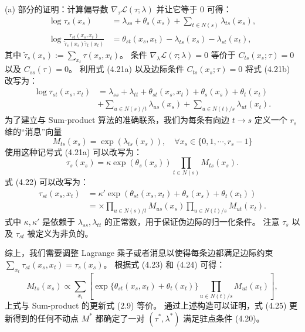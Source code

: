 \analysis[证明]
(a) 部分的证明：计算偏导数 $\nabla_{\tau}\mathcal{L}(\tau; \lambda)$ 并让它等于 0 可得：
\begin{subequations}
\begin{align}
    \log\tau_s(x_s) &= \lambda_{ss} + \theta_s(x_s) + \sum_{t \in N(s)}\lambda_{ts}(x_s), \\
    \log\frac{\tau_{st}(x_s, x_t)}{\tilde{\tau}_s(x_s)\tilde{\tau}_t(x_t)} &= \theta_{st}(x_s, x_t) - \lambda_{ts}(x_s) - \lambda_{st}(x_t), 
\end{align}
\end{subequations}
其中 $\tilde{\tau}_s(x_s) := \sum_{x_t}\tau(x_s, x_t)$。
条件 $\nabla_{\lambda}\mathcal{L}(\tau; \lambda) = 0$ 等价于 $C_{ts}(x_s; \tau) = 0$ 以及 $C_{ss}(\tau) = 0$。
利用式 (4.21a) 以及边际条件 $C_{ts}(x_s; \tau) = 0$ 将式 (4.21b) 改写为：
\begin{align}
    \log\tau_{st}(x_s, x_t) &= \lambda_{ss} + \lambda_{tt} + \theta_{st}(x_s, x_t) + \theta_s(x_s) + \theta_t(x_t) \nonumber \\
    & + \sum_{u \in N(s)/t}\lambda_{us}(x_s) + \sum_{u \in N(t)/s}\lambda_{ut}(x_t).
\end{align}
为了建立与 Sum-product 算法的准确联系，我们为每条有向边 $t \rightarrow s$ 定义一个 $r_s$ 维的“消息”向量
\begin{equation*}
    M_{ts}(x_s) = \exp(\lambda_{ts}(x_s)), \quad \forall x_s \in \{0, 1, \cdots, r_s-1\}
\end{equation*}
使用这种记号式 (4.21a) 可以改写为：
\begin{equation}
    \tau_s(x_s) = \kappa\exp(\theta_s(x_s))\prod_{t \in N(s)}M_{ts}(x_s).
\end{equation}
式 (4.22) 可以改写为：
\begin{align}
    \tau_{st}(x_s, x_t) &= \kappa'\exp(\theta_{st}(x_s, x_t) + \theta_s(x_s) + \theta_t(x_t)) \nonumber \\
    &= \times \prod_{u \in N(s)/t}M_{us}(x_s) \prod_{u \in N(t)/s}M_{ut}(x_t).
\end{align}
式中 $\kappa, \kappa'$ 是依赖于 $\lambda_{ss}, \lambda_{tt}$ 的正常数，用于保证伪边际的归一化条件。
注意 $\tau_s$ 以及 $\tau_{st}$ 被定义为非负的。

综上，我们需要调整 Lagrange 乘子或者消息以使得每条边都满足边际约束 $\sum_{x_t}\tau_{st}(x_s, x_t) = \tau_s(x_s)$。
根据式 (4.23) 和 (4.24) 可得：
\begin{equation}
    M_{ts}(x_s) \propto \sum_{x_t}\left[\exp\{\theta_{st}(x_s, x_t)+\theta_t(x_t)\}\prod_{u \in N(t)/s}M_{ut}(x_t)\right], 
\end{equation}
上式与 Sum-product 的更新式 (2.9) 等价。
通过上述构造可以证明，式 (4.25) 更新得到的任何不动点 $M^*$ 都确定了一对 $(\tau^*, \lambda^*)$ 满足驻点条件 (4.20)。

